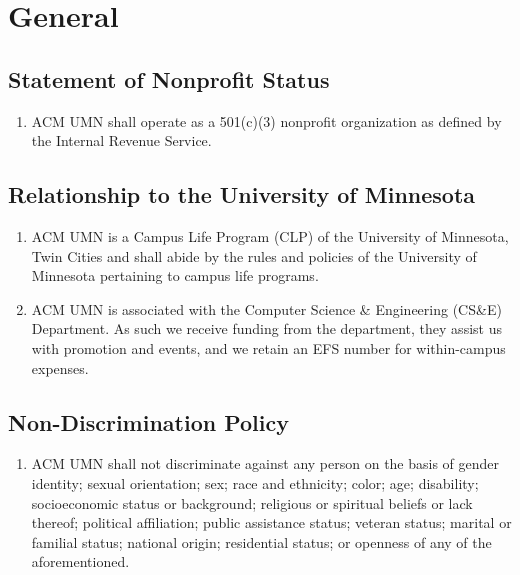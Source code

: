 



\section{General}



\subsection{Statement of Nonprofit Status}
\begin{enumerate}
	\item ACM UMN shall operate as a 501(c)(3) nonprofit organization as defined by the Internal Revenue Service.
\end{enumerate}

\subsection{Relationship to the University of Minnesota}
\begin{enumerate}
	\item ACM UMN is a Campus Life Program (CLP) of the University of Minnesota, Twin Cities and shall abide by the rules and policies of the University of Minnesota pertaining to campus life programs.
	\item ACM UMN is associated with the Computer Science \& Engineering (CS\&E) Department. As such we receive funding from the department, they assist us with promotion and events, and we retain an EFS number for within-campus expenses.
\end{enumerate}

\subsection{Non-Discrimination Policy}
\begin{enumerate}
	\item ACM UMN shall not discriminate against any person on the basis of gender identity; sexual orientation; sex; race and ethnicity; color; age; disability; socioeconomic status or background; religious or spiritual beliefs or lack thereof; political affiliation; public assistance status; veteran status; marital or familial status; national origin; residential status; or openness of any of the aforementioned.
\end{enumerate}

